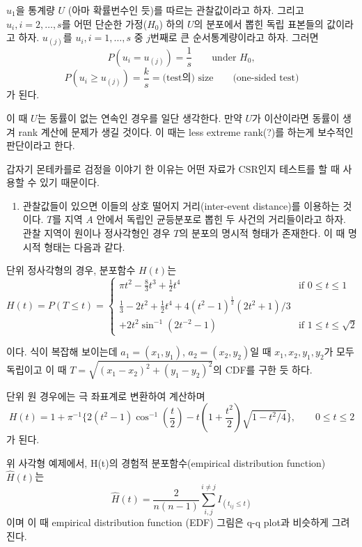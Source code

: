 \documentclass[b5paper,]{scrbook}
\providecommand{\tightlist}{%
  \setlength{\itemsep}{0pt}\setlength{\parskip}{0pt}}
\theoremstyle{plain}
\theoremstyle{definition}
\numberwithin{equation}{section}
\begin{document}
\(u_{1}\)을 통계량 \(U\) (아마 확률번수인 듯)를 따르는 관찰값이라고 하자. 그리고 \(u_{i}, i =2,\ldots, s\)를 어떤 단순한 가정(\(H_{0}\)) 하의 \(U\)의 분포에서 뽑힌 독립 표본들의 값이라고 하자. \(u_{(j)}\)를 \(u_{i}, i=1,\ldots , s\) 중 \(j\)번째로 큰 순서통계량이라고 하자. 그러면
\[P(u_{i}=u_{(j)})=\frac{1}{s} \qquad{\text{under } H_{0}},\]
\[P(u_{i}\geq u_{(j)})=\frac{k}{s}=\text{(test의) size} \qquad{\text{(one-sided test)}}\]
가 된다.

이 때 \(U\)는 동률이 없는 연속인 경우를 일단 생각한다. 만약 \(U\)가 이산이라면 동률이 생겨 rank 계산에 문제가 생길 것이다. 이 때는 less extreme rank(?)를 하는게 보수적인 판단이라고 한다.

갑자기 몬테카를로 검정을 이야기 한 이유는 어떤 자료가 CSR인지 테스트를 할 때 사용할 수 있기 때문이다.

\begin{enumerate}
\def\labelenumi{\arabic{enumi}.}
\tightlist
\item
  관찰값들이 있으면 이들의 상호 떨어지 거리(inter-event distance)를 이용하는 것이다. \(T\)를 지역 \(A\) 안에서 독립인 균등분포로 뽑힌 두 사건의 거리들이라고 하자. 관찰 지역이 원이나 정사각형인 경우 \(T\)의 분포의 명시적 형태가 존재한다. 이 때 명시적 형태는 다음과 같다.
\end{enumerate}

단위 정사각형의 경우, 분포함수 \(H(t)\)는
\[
H(t)=P(T\leq t) =
\begin{cases}
\pi t^{2}-\frac{8}{3}t^{3}+\frac{1}{2}t^{4} & \text{if $0 \leq t \leq 1$}\\
\frac{1}{3} -2t^{2} + \frac{1}{2}t^{4} + 4(t^{2}-1)^{\frac{1}{2}}(2t^{2}+1)/3\\
+ 2t^{2}\sin^{-1}(2t^{-2}-1) & \text{if $1\leq t \leq \sqrt{2}$}
\end{cases}
\]

이다. 식이 복잡해 보이는데 \(a_{1}=(x_{1},y_{1})\), \(a_{2}=(x_{2},y_{2})\)일 때 \(x_{1}, x_{2}, y_{1}, y_{2}\)가 모두 독립이고 이 때 \(T=\sqrt{(x_{1}-x_{2})^{2}+(y_{1}-y_{2})^{2}}\)의 CDF를 구한 듯 하다.

단위 원 경우에는 극 좌표계로 변환하여 계산하며
\[H(t)=1+\pi^{-1}\{2(t^{2}-1)\cos^{-1}(\frac{t}{2})-t(1+\frac{t^{2}}{2})\sqrt{1-t^{2}/4}\}, \qquad{0\leq t \leq 2}\]
가 된다.

위 사각형 예제에서, H(t)의 경험적 분포함수(empirical distribution function) \(\hat{H}(t)\)는
\[\hat{H}(t)=\frac{2}{n(n-1)}\sum_{i,j}^{i\neq j}I_{(t_{ij}\leq t)}\]
이며 이 때 empirical distribution function (EDF) 그림은 q-q plot과 비슷하게 그려진다.
\end{document}
